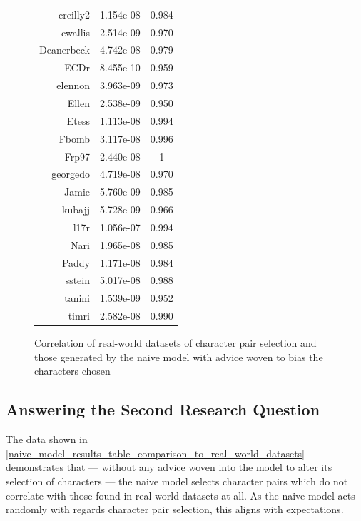 \begin{figure}[h]
\begin{minipage}{.45\textwidth}
\begin{tabular}{r|c|c}
      creilly2 & 1.154e-08 & 0.984  \\
      cwallis & 2.514e-09 & 0.970  \\
      Deanerbeck & 4.742e-08 & 0.979  \\
      ECDr & 8.455e-10 & 0.959  \\
      elennon & 3.963e-09 & 0.973  \\
      Ellen & 2.538e-09 & 0.950  \\
      Etess & 1.113e-08 & 0.994  \\
      Fbomb & 3.117e-08 & 0.996  \\
      Frp97 & 2.440e-08 & 1  \\
      georgedo & 4.719e-08 & 0.970  \\
      Jamie & 5.760e-09 & 0.985  \\
      kubajj & 5.728e-09 & 0.966  \\
      l17r & 1.056e-07 & 0.994  \\
      Nari & 1.965e-08 & 0.985  \\
      Paddy & 1.171e-08 & 0.984  \\
      sstein & 5.017e-08 & 0.988  \\
      tanini & 1.539e-09 & 0.952  \\
      timri & 2.582e-08 & 0.990  \\
    \end{tabular}
    \caption{Correlation of real-world datasets of character pair selection and those generated by the naive model with advice woven to bias the characters chosen}
    \label{prior_distribution_results_table_comparison_to_real_world_datasets}
  \end{minipage}

\end{figure}



\subsection{Answering the Second Research Question}

The data shown in
\cref{naive_model_results_table_comparison_to_real_world_datasets} demonstrates
that --- without any advice woven into the model to alter its selection of
characters --- the naive model selects character pairs which do not correlate
with those found in real-world datasets at all. As the naive model acts randomly
with regards character pair selection, this aligns with expectations.

